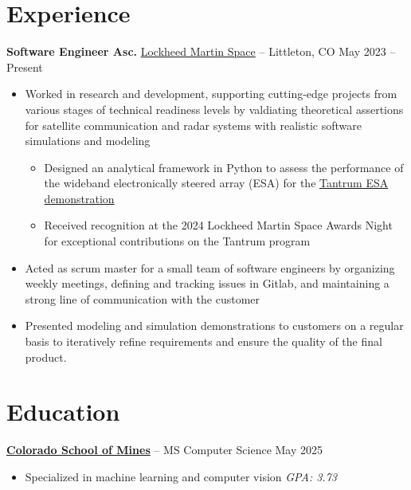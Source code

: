 \documentclass[11pt]{article}       %
\begin{document}
\section*{Experience}
\textbf{Software Engineer Asc.} \href{https://www.lockheedmartin.com/en-us/capabilities/space.html}{Lockheed Martin Space}
-- Littleton, CO \hfill May 2023 -- Present \\
\vspace{-9pt}
\begin{itemize}
	\item Worked in research and development, supporting cutting-edge projects
	      from various stages of technical readiness levels by valdiating
	      theoretical assertions for satellite communication and radar systems
	      with realistic software simulations and modeling
	      \vspace{-7.5pt}
	      \begin{itemize}
		      \item Designed an analytical framework in Python to assess the
		            performance of the wideband electronically steered array (ESA)
		            for the \href{https://news.lockheedmartin.com/ESA_payload_demonstrator}{Tantrum ESA demonstration}
		      \item Received recognition at the 2024 Lockheed Martin Space Awards Night
		            for exceptional contributions on the Tantrum program
	      \end{itemize}
	      \vspace{-6.5pt}
	\item Acted as scrum master for a small team of software engineers by
	      organizing weekly meetings, defining and tracking issues in Gitlab,
	      and maintaining a strong line of communication with the customer
	\item Presented modeling and simulation demonstrations to customers on a
	      regular basis to iteratively refine requirements and ensure the
	      quality of the final product.
\end{itemize}

\vspace{-18.5pt}

\section*{Education}
\textbf{\href{https://cs.mines.edu}{Colorado School of Mines}} -- MS Computer Science \hfill May 2025 \\
\vspace{-11.5pt}
\begin{itemize}
	\itemsep -0.5em
	\item Specialized in machine learning and computer vision \hfill \textit{GPA: 3.73}
\end{itemize}
\end{document}
